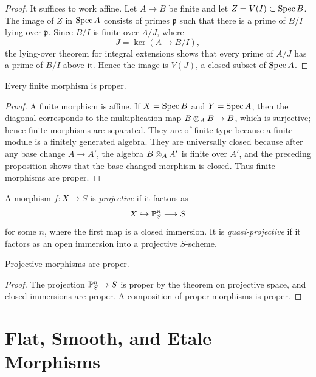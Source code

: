 \begin{proof}
It suffices to work affine.  Let \(A\to B\) be finite and let
\(Z=V(I)\subset\operatorname{Spec} B\).  The image of \(Z\) in \(\operatorname{Spec} A\) consists of primes
\(\mathfrak p\) such that there is a prime of \(B/I\) lying over
\(\mathfrak p\).  Since \(B/I\) is finite over \(A/J\), where
\[
    J=\ker(A\to B/I),
\]
the lying-over theorem for integral extensions shows that every prime of
\(A/J\) has a prime of \(B/I\) above it.  Hence the image is \(V(J)\), a closed
subset of \(\operatorname{Spec} A\).
\end{proof}

\begin{corollary}
Every finite morphism is proper.
\end{corollary}

\begin{proof}
A finite morphism is affine.  If \(X=\operatorname{Spec} B\) and \(Y=\operatorname{Spec} A\), then the
diagonal corresponds to the multiplication map \(B\otimes_A B\to B\), which is
surjective; hence finite morphisms are separated.  They are of finite type
because a finite module is a finitely generated algebra.  They are universally
closed because after any base change \(A\to A'\), the algebra
\(B\otimes_A A'\) is finite over \(A'\), and the preceding proposition shows
that the base-changed morphism is closed.  Thus finite morphisms are proper.
\end{proof}

\begin{definition}
A morphism \(f:X\to S\) is \emph{projective} if it factors as
\[
    X\hookrightarrow \mathbb{P}^n_S\longrightarrow S
\]
for some \(n\), where the first map is a closed immersion.  It is
\emph{quasi-projective} if it factors as an open immersion into a projective
\(S\)-scheme.
\end{definition}

\begin{proposition}
Projective morphisms are proper.
\end{proposition}

\begin{proof}
The projection \(\mathbb{P}^n_S\to S\) is proper by the theorem on projective space,
and closed immersions are proper.  A composition of proper morphisms is proper.
\end{proof}

\section{Flat, Smooth, and Etale Morphisms}


